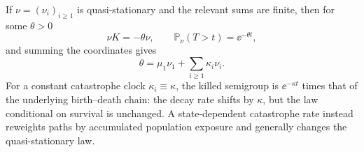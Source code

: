 If \(\nu=(\nu_i)_{i\ge1}\) is quasi-stationary and the relevant sums are finite,
then for some \(\theta>0\)
\begin{equation}
 \nu K=-\theta\nu,
 \qquad \mathbb P_{\nu}(T>t)=\ee^{-\theta t},
 \label{m:eq:bdc-qsd-eigenrelation}
\end{equation}
and summing the coordinates gives
\begin{equation}
 \theta=\mu_1\nu_1+\sum_{i\ge1}\kappa_i\nu_i.
 \label{m:eq:bdc-qsd-decay-rate}
\end{equation}
For a constant catastrophe clock \(\kappa_i\equiv\kappa\), the killed semigroup is
\(\ee^{-\kappa t}\) times that of the underlying birth--death chain: the decay
rate shifts by \(\kappa\), but the law conditional on survival is unchanged.  A
state-dependent catastrophe rate instead reweights paths by accumulated population
exposure and generally changes the quasi-stationary law.

\FloatBarrier
